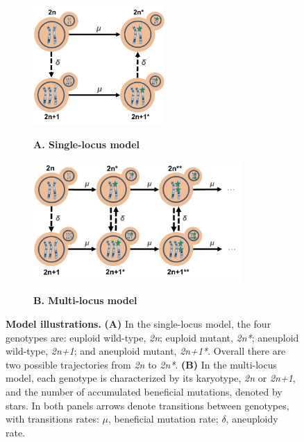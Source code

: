 \documentclass[12pt]{extarticle}
\newcommand{\euwt}{\emph{2n}}
\newcommand{\anwt}{\emph{2n+1}}
\newcommand{\eumt}{\emph{2n*}}
\newcommand{\anmt}{\emph{2n+1*}}
\begin{document}
\begin{figure}[b!]
  \begin{subfigure}[t]{0.4\textwidth}
      \caption{
        \textbf{A. Single-locus model}
      }
      \centering
      \includegraphics[height=1.8in]{../figures/Fig1-A.pdf}      
      \label{fig:model1}
  \end{subfigure}
  \begin{subfigure}[t]{0.4\textwidth}
  	  \caption{
        \textbf{B. Multi-locus model}
      }
      \centering
      \includegraphics[height=1.8in]{../figures/Fig1-B.pdf}      
      \label{fig:model2}
  \end{subfigure}
  \caption{
    \textbf{Model illustrations.}
    \textbf{(A)} In the single-locus model, the four genotypes are: euploid wild-type, \euwt; euploid mutant, \eumt; aneuploid wild-type, \anwt; and aneuploid mutant, \anmt.
    Overall there are two possible trajectories from \euwt\; to \eumt.
    \textbf{(B)} In the multi-locus model, each genotype is characterized by its karyotype, \euwt\; or \anwt, and the number of accumulated beneficial mutations, denoted by stars. 
    In both panels arrows denote transitions between genotypes, with transitions rates: $\mu$, beneficial mutation rate; $\delta$, aneuploidy rate.
  }
  \label{fig:models}
\end{figure}

\end{document}
